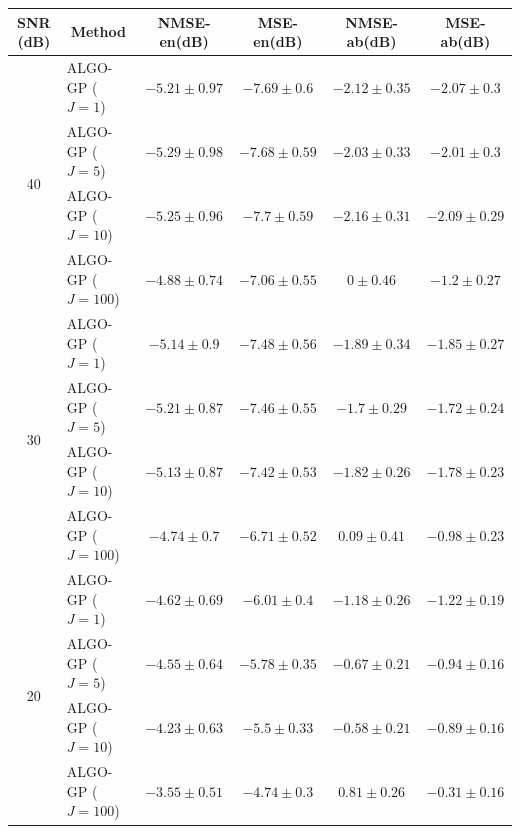 \begin{table}[h]
\centering
\begin{adjustbox}{max width=\textwidth}
\begin{tabular}{|c|l|c|c|c|c|}
\hline
SNR (dB)            & \multicolumn{1}{c|}{Method}& NMSE-en(dB)         & MSE-en(dB)          & NMSE-ab(dB)         & MSE-ab(dB)          \tabularnewline \hline
\multirow{4}{*}{40} & ALGO-GP ($J=1$)            & $-5.21    \pm 0.97$ & $-7.69    \pm 0.6$  & $-2.12    \pm 0.35$ & $-2.07    \pm 0.3$  \tabularnewline
                    & ALGO-GP ($J=5$)            & $-5.29    \pm 0.98$ & $-7.68    \pm 0.59$ & $-2.03    \pm 0.33$ & $-2.01    \pm 0.3$  \tabularnewline
                    & ALGO-GP ($J=10$)           & $-5.25    \pm 0.96$ & $-7.7     \pm 0.59$ & $-2.16    \pm 0.31$ & $-2.09    \pm 0.29$ \tabularnewline
                    & ALGO-GP ($J=100$)          & $-4.88    \pm 0.74$ & $-7.06    \pm 0.55$ & $0        \pm 0.46$ & $-1.2     \pm 0.27$ \tabularnewline \hline
\multirow{4}{*}{30} & ALGO-GP ($J=1$)            & $-5.14    \pm 0.9$  & $-7.48    \pm 0.56$ & $-1.89    \pm 0.34$ & $-1.85    \pm 0.27$ \tabularnewline
                    & ALGO-GP ($J=5$)            & $-5.21    \pm 0.87$ & $-7.46    \pm 0.55$ & $-1.7     \pm 0.29$ & $-1.72    \pm 0.24$ \tabularnewline
                    & ALGO-GP ($J=10$)           & $-5.13    \pm 0.87$ & $-7.42    \pm 0.53$ & $-1.82    \pm 0.26$ & $-1.78    \pm 0.23$ \tabularnewline
                    & ALGO-GP ($J=100$)          & $-4.74    \pm 0.7$  & $-6.71    \pm 0.52$ & $0.09     \pm 0.41$ & $-0.98    \pm 0.23$ \tabularnewline \hline
\multirow{4}{*}{20} & ALGO-GP ($J=1$)            & $-4.62    \pm 0.69$ & $-6.01    \pm 0.4$  & $-1.18    \pm 0.26$ & $-1.22    \pm 0.19$ \tabularnewline
                    & ALGO-GP ($J=5$)            & $-4.55    \pm 0.64$ & $-5.78    \pm 0.35$ & $-0.67    \pm 0.21$ & $-0.94    \pm 0.16$ \tabularnewline
                    & ALGO-GP ($J=10$)           & $-4.23    \pm 0.63$ & $-5.5     \pm 0.33$ & $-0.58    \pm 0.21$ & $-0.89    \pm 0.16$ \tabularnewline
                    & ALGO-GP ($J=100$)          & $-3.55    \pm 0.51$ & $-4.74    \pm 0.3$  & $0.81     \pm 0.26$ & $-0.31    \pm 0.16$ \tabularnewline \hline

\end{tabular}
\end{adjustbox}
\end{table}
